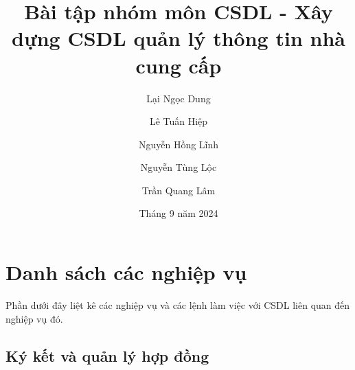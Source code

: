 \documentclass{article}
\begin{document}
	\title{Bài tập nhóm môn CSDL - Xây dựng CSDL quản lý thông tin nhà cung cấp}
	\author{Lại Ngọc Dung}
	\author{Lê Tuấn Hiệp}
	\author{Nguyễn Hồng Lĩnh}
	\author{Nguyễn Tùng Lộc}
	\author{Trần Quang Lâm}

	\date{Tháng 9 năm 2024}
	\maketitle

	\section{Danh sách các nghiệp vụ}

	Phần dưới đây liệt kê các nghiệp vụ và các lệnh làm việc với CSDL liên quan
	đến nghiệp vụ đó.

	\subsection{Ký kết và quản lý hợp đồng}
\end{document}
